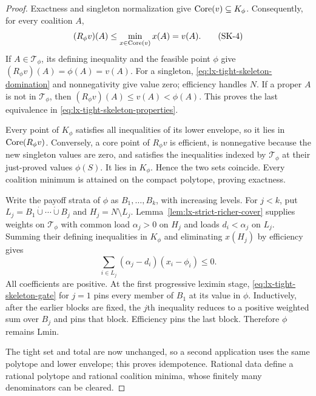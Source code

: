 \begin{proof}
Exactness and singleton normalization give $\operatorname{Core}(v)\subseteq K_\phi$.
Consequently, for every coalition $A$,
\[
 (R_\phi v)(A)\leq\min_{x\in\operatorname{Core}(v)}x(A)=v(A).                  \tag{SK-4}
 \label{eq:lx-tight-skeleton-domination}
\]
If $A\in\mathcal T_\phi$, its defining inequality and the feasible point
$\phi$ give $(R_\phi v)(A)=\phi(A)=v(A)$.  For a singleton,
\eqref{eq:lx-tight-skeleton-domination} and nonnegativity give value zero;
efficiency handles $N$.  If a proper $A$ is not in $\mathcal T_\phi$, then
$(R_\phi v)(A)\leq v(A)<\phi(A)$.  This proves the last equivalence in
\eqref{eq:lx-tight-skeleton-properties}.

Every point of $K_\phi$ satisfies all inequalities of its lower envelope,
so it lies in $\operatorname{Core}(R_\phi v)$.  Conversely, a core point of $R_\phi v$ is
efficient, is nonnegative because the new singleton values are zero, and
satisfies the inequalities indexed by $\mathcal T_\phi$ at their just-proved
values $\phi(S)$.  It lies in $K_\phi$.  Hence the two sets coincide.
Every coalition minimum is attained on the compact polytope, proving
exactness.

Write the payoff strata of $\phi$ as $B_1,\ldots,B_k$, with increasing
levels.  For $j<k$, put
$L_j=B_1\mathbin{\dot\cup}\cdots\mathbin{\dot\cup}B_j$ and
$H_j=N\setminus L_j$.  Lemma~\ref{lem:lx-strict-richer-cover} supplies
weights on $\mathcal T_\phi$ with common load $\alpha_j>0$ on $H_j$ and
loads $d_i<\alpha_j$ on $L_j$.  Summing their defining inequalities in
$K_\phi$ and eliminating $x(H_j)$ by efficiency gives
\[
 \sum_{i\in L_j}(\alpha_j-d_i)(x_i-\phi_i)\leq0.                \tag{SK-5}
 \label{eq:lx-tight-skeleton-gate}
\]
All coefficients are positive.  At the first progressive leximin stage,
\eqref{eq:lx-tight-skeleton-gate} for $j=1$ pins every member of $B_1$ at
its value in $\phi$.  Inductively, after the earlier blocks are fixed, the
$j$th inequality reduces to a positive weighted sum over $B_j$ and pins that
block.  Efficiency pins the last block.  Therefore $\phi$ remains Lmin.

The tight set and total are now unchanged, so a second application uses the
same polytope and lower envelope; this proves idempotence.  Rational data
define a rational polytope and rational coalition minima, whose finitely many
denominators can be cleared.
\end{proof}


